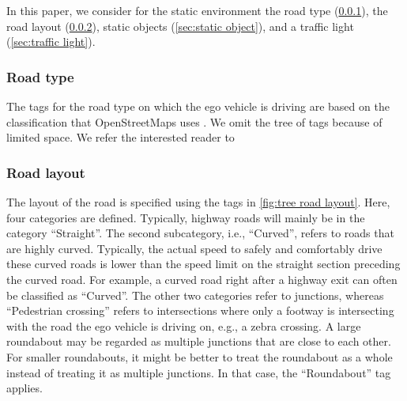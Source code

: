 In this paper, we consider for the static environment the road type (\cref{sec:road type}), the road layout (\cref{sec:road layout}), static objects (\cref{sec:static object}), and a traffic light (\cref{sec:traffic light}).



\subsubsection{Road type}
\label{sec:road type}

The tags for the road type on which the ego vehicle is driving are based on the classification that OpenStreetMaps uses \autocite{HighwayKeyOSM}. We omit the tree of tags because of limited space. We refer the interested reader to \autocite{HighwayKeyOSM}

%



\subsubsection{Road layout}
\label{sec:road layout}

The layout of the road is specified using the tags in \cref{fig:tree road layout}. Here, four categories are defined. Typically, highway roads will mainly be in the category ``Straight''. The second subcategory, i.e., ``Curved'', refers to roads that are highly curved. Typically, the actual speed to safely and comfortably drive these curved roads is lower than the speed limit on the straight section preceding the curved road. For example, a curved road right after a highway exit can often be classified as ``Curved''. The other two categories refer to junctions, whereas ``Pedestrian crossing'' refers to intersections where only a footway is intersecting with the road the ego vehicle is driving on, e.g., a zebra crossing. A large roundabout may be regarded as multiple junctions that are close to each other. For smaller roundabouts, it might be better to treat the roundabout as a whole instead of treating it as multiple junctions. In that case, the ``Roundabout'' tag applies.



